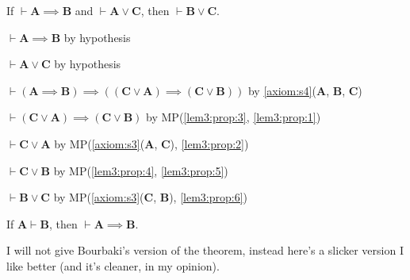 \documentclass{amsart}%
\newcommand\metavariable[1]{\boldsymbol{#1}}
\begin{document}
\begin{lemma}\label{lem3:prop}
If $\vdash\metavariable{A}\implies\metavariable{B}$
and $\vdash\metavariable{A}\lor\metavariable{C}$,
then $\vdash\metavariable{B}\lor\metavariable{C}$.
\end{lemma}
\begin{pf}
\item\label{lem3:prop:1} $\vdash\metavariable{A}\implies\metavariable{B}$ by hypothesis
\item\label{lem3:prop:2} $\vdash\metavariable{A}\lor\metavariable{C}$ by hypothesis
\item\label{lem3:prop:3} $\vdash(\metavariable{A}\implies\metavariable{B})\implies((\metavariable{C}\lor\metavariable{A})\implies(\metavariable{C}\lor\metavariable{B}))$
  by \ref{axiom:s4}($\metavariable{A}$, $\metavariable{B}$, $\metavariable{C}$)
\item\label{lem3:prop:4} $\vdash(\metavariable{C}\lor\metavariable{A})\implies(\metavariable{C}\lor\metavariable{B})$
  by MP(\ref{lem3:prop:3}, \ref{lem3:prop:1})
\item\label{lem3:prop:5} $\vdash\metavariable{C}\lor\metavariable{A}$ by MP(\ref{axiom:s3}($\metavariable{A}$, $\metavariable{C}$), \ref{lem3:prop:2})
\item\label{lem3:prop:6} $\vdash\metavariable{C}\lor\metavariable{B}$
  by MP(\ref{lem3:prop:4}, \ref{lem3:prop:5})
\item\label{lem3:prop:7} $\vdash\metavariable{B}\lor\metavariable{C}$
  by MP(\ref{axiom:s3}($\metavariable{C}$, $\metavariable{B}$), \ref{lem3:prop:6})
\end{pf}

\begin{dc}\label{dc:14}
If $\metavariable{A}\vdash\metavariable{B}$, then $\vdash\metavariable{A}\implies\metavariable{B}$.
\end{dc}

I will not give Bourbaki's version of the theorem, instead here's a
slicker version I like better (and it's cleaner, in my opinion).
\end{document}
